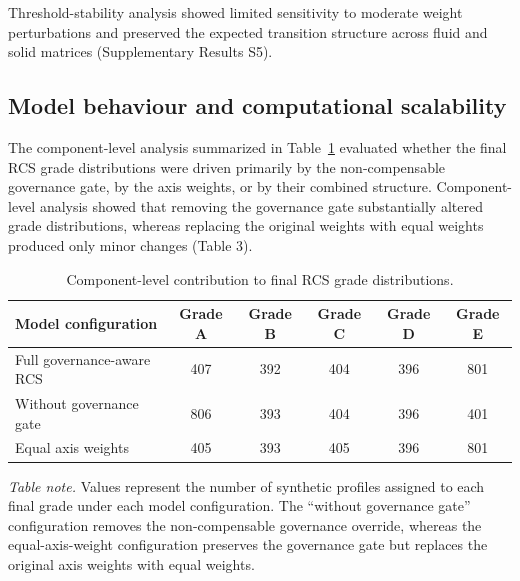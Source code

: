 \documentclass[preprint,12pt]{elsarticle}
\renewcommand{\arraystretch}{1.15}
\begin{document}
Threshold-stability analysis showed limited sensitivity to moderate weight perturbations and preserved the expected transition structure across fluid and solid matrices (Supplementary 
Results S5).

\subsection{Model behaviour and computational scalability}

The component-level analysis summarized in Table~\ref{tab:ablation_summary} evaluated whether the final RCS grade distributions were driven primarily by the non-compensable governance gate, 
by the axis weights, or by their combined structure. Component-level analysis showed that removing the governance gate substantially altered grade distributions, whereas replacing the original weights with equal weights produced only minor changes (Table 3).

\begin{table}[!htbp]
\caption{Component-level contribution to final RCS grade distributions.}
\label{tab:ablation_summary}
\centering

\footnotesize
\setlength{\tabcolsep}{4pt}
\renewcommand{\arraystretch}{1.12}

\begin{tabular}{@{}p{4.2cm}ccccc@{}}
\toprule
\textbf{Model configuration}
& \textbf{Grade A}
& \textbf{Grade B}
& \textbf{Grade C}
& \textbf{Grade D}
& \textbf{Grade E} \\
\midrule

Full governance-aware RCS
& 407 & 392 & 404 & 396 & 801 \\

Without governance gate
& 806 & 393 & 404 & 396 & 401 \\

Equal axis weights
& 405 & 393 & 405 & 396 & 801 \\

\bottomrule
\end{tabular}

\vspace{0.35em}

\begin{minipage}{0.92\textwidth}
\footnotesize
\textit{Table note.}
Values represent the number of synthetic profiles assigned to each final grade under each model configuration. The ``without governance gate'' configuration removes the non-compensable governance override, whereas the equal-axis-weight configuration preserves the governance gate but replaces the original axis weights with equal weights.
\end{minipage}
\end{table}
\end{document}
